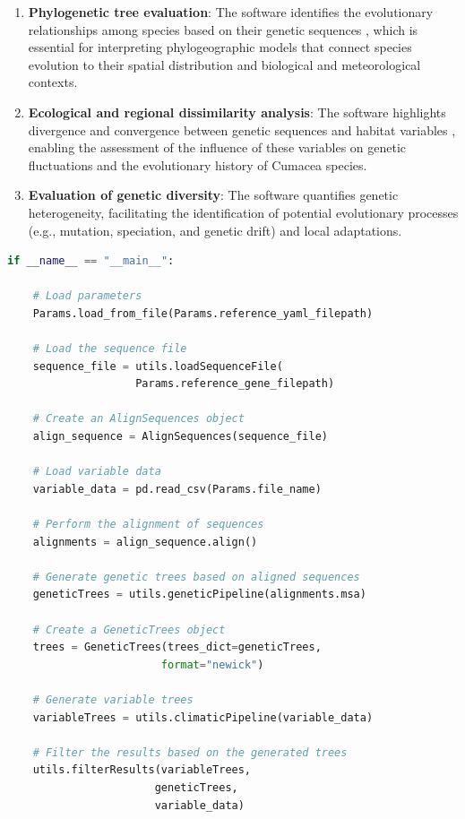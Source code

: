 \begin{enumerate}[label=\arabic*.]
\item \textbf{Phylogenetic tree evaluation}: The software identifies the evolutionary relationships among species based on their genetic sequences \citep{koshkarov_phylogeography_2022, li2023aphylogeo, li2024host}, which is essential for interpreting phylogeographic models that connect species evolution to their spatial distribution and biological and meteorological contexts.

\item \textbf{Ecological and regional dissimilarity analysis}: The software highlights divergence and convergence between genetic sequences and habitat variables \citep{koshkarov_phylogeography_2022, li2023aphylogeo, li2024host}, enabling the assessment of the influence of these variables on genetic fluctuations and the evolutionary history of Cumacea species.

\item \textbf{Evaluation of genetic diversity}: The software quantifies genetic heterogeneity, facilitating the identification of potential evolutionary processes (e.g., mutation, speciation, and genetic drift) and local adaptations.
\end{enumerate}

\begin{lstlisting}[label=lst:main,language=Python,caption=Main script for tutorial using the aPhyloGeo package.]
if __name__ == "__main__":

    # Load parameters
    Params.load_from_file(Params.reference_yaml_filepath)

    # Load the sequence file
    sequence_file = utils.loadSequenceFile(
                    Params.reference_gene_filepath)

    # Create an AlignSequences object
    align_sequence = AlignSequences(sequence_file)

    # Load variable data
    variable_data = pd.read_csv(Params.file_name)

    # Perform the alignment of sequences
    alignments = align_sequence.align()

    # Generate genetic trees based on aligned sequences
    geneticTrees = utils.geneticPipeline(alignments.msa)

    # Create a GeneticTrees object
    trees = GeneticTrees(trees_dict=geneticTrees,
                        format="newick")

    # Generate variable trees
    variableTrees = utils.climaticPipeline(variable_data)

    # Filter the results based on the generated trees
    utils.filterResults(variableTrees,
                       geneticTrees,
                       variable_data)
\end{lstlisting}

